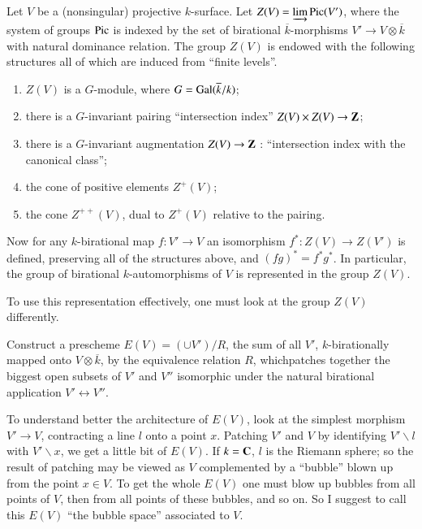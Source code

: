 Let $V$ be a (nonsingular) projective $k$-surface. Let $Z(V)=\varinjlim \operatorname{\mathrm{Pic}} (V')$, where the system of groups $\operatorname{\mathrm{Pic}}$ is indexed by the set of birational $\overline{k}$-morphisms $V'\to V\otimes \overline{k}$ with natural dominance relation. The group $Z(V)$ is endowed with the following structures all of which are induced from ``finite levels''.
\begin{enumerate}
\item $Z(V)$ is a $G$-module, where $G=\operatorname{\mathrm{Gal}} (\overline{k}/k)$;

\item there is a $G$-invariant pairing ``intersection index'' $Z(V)\times Z(V)\to \mathbf{Z}$;

\item there is a $G$-invariant augmentation $Z(V)\to \mathbf{Z}$ : ``intersection index with the canonical class'';

\item the cone of positive elements $Z^{+}(V)$;

\item the cone $Z^{++}(V)$, dual to $Z^{+}(V)$ relative to the pairing.
\end{enumerate}

Now for any $k$-birational map $f:V'\to V$ an isomorphism $f^{*}:Z(V)\to Z(V')$ is defined, preserving all of the structures above, and $(fg)^{*}=f^{*}g^{*}$. In particular, the group of birational $k$-automorphisms of $V$ is represented in the group $Z(V)$.

To use this representation effectively, one must look at the group $Z(V)$ differently.

Construct a prescheme $E(V)=(\cup V')/R$, the sum of all $V'$, $k$-birationally mapped onto $V\otimes\overline{k}$, by the equivalence relation $R$, which\pageoriginale patches together the biggest open subsets of $V'$ and $V''$ isomorphic under the natural birational application $V'\longleftrightarrow V''$.

To understand better the architecture of $E(V)$, look at the simplest morphism $V'\to V$, contracting a line $l$ onto a point $x$. Patching $V'$ and $V$ by identifying $V'\backslash l$ with $V'\backslash x$, we get a little bit of $E(V)$. If $k=\mathbf{C}$, $l$ is the Riemann sphere; so the result of patching may be viewed as $V$ complemented by a ``bubble'' blown up from the point $x\in V$. To get the whole $E(V)$ one must blow up bubbles from all points of $V$, then from all points of these bubbles, and so on. So I suggest to call this $E(V)$ ``the bubble space'' associated to $V$.

